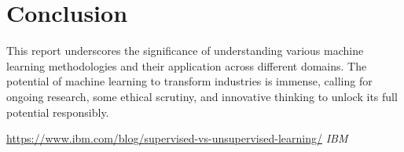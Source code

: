 \documentclass[11pt, a4paper]{article}
\begin{document}
\section{Conclusion}
This report underscores the significance of understanding various machine learning methodologies and their application across different domains. The potential of machine learning to transform industries is immense, calling for ongoing research, some ethical scrutiny, and innovative thinking to unlock its full potential responsibly.



\newpage
\begin{thebibliography}{9}
  \url{https://www.ibm.com/blog/supervised-vs-unsupervised-learning/}
  \textit{IBM}
\end{thebibliography}
\end{document}
